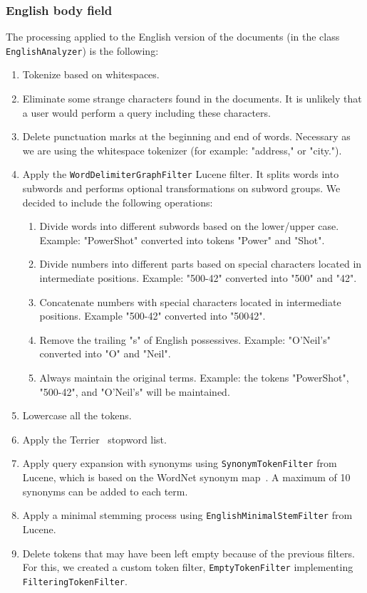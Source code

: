 \subsubsection{English body field}
The processing applied to the English version of the documents (in the class \texttt{EnglishAnalyzer}) is the following:
\begin{enumerate}
    \item Tokenize based on whitespaces.
    \item Eliminate some strange characters found in the documents.
          It is unlikely that a user would perform a query including these characters.
    \item Delete punctuation marks at the beginning and end of words.
          Necessary as we are using the whitespace tokenizer (for example: "address," or "city.").
    \item Apply the \texttt{WordDelimiterGraphFilter} Lucene filter.
          It splits words into subwords and performs optional transformations on subword groups.
          We decided to include the following operations:
          \begin{enumerate}
              \item Divide words into different subwords based on the lower/upper case.
                    Example: "PowerShot" converted into tokens "Power" and "Shot".
              \item Divide numbers into different parts based on special characters located in intermediate positions.
                    Example: "500-42" converted into "500" and "42".
              \item Concatenate numbers with special characters located in intermediate positions.
                    Example "500-42" converted into "50042".
              \item Remove the trailing "s" of English possessives.
                    Example: "O'Neil's" converted into "O" and "Neil".
              \item Always maintain the original terms.
                    Example: the tokens "PowerShot", "500-42", and "O'Neil's" will be maintained.
          \end{enumerate}
    \item Lowercase all the tokens.
    \item Apply the Terrier~\cite{OunisEtAl2006} stopword list.
    \item Apply query expansion with synonyms using \texttt{SynonymTokenFilter} from Lucene, which is based on the
          WordNet synonym map~\cite{wordnet}.
          A maximum of 10 synonyms can be added to each term.
    \item Apply a minimal stemming process using \texttt{EnglishMinimalStemFilter} from Lucene.
    \item Delete tokens that may have been left empty because of the previous filters.
          For this, we created a custom token filter, \texttt{EmptyTokenFilter} implementing \texttt{FilteringTokenFilter}.
\end{enumerate}

